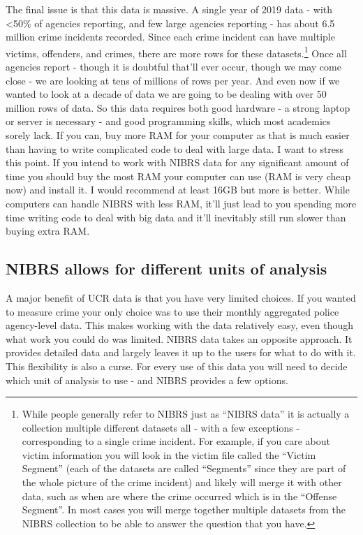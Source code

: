 \documentclass[
]{krantz}
\begin{document}
The final issue is that this data is massive. A single year
of 2019 data - with \textless50\% of agencies reporting, and
few large agencies reporting - has about 6.5 million crime
incidents recorded. Since each crime incident can have
multiple victims, offenders, and crimes, there are more rows
for these datasets.\footnote{While people generally refer to
  NIBRS just as ``NIBRS data'' it is actually a collection
  multiple different datasets all - with a few exceptions -
  corresponding to a single crime incident. For example, if
  you care about victim information you will look in the
  victim file called the ``Victim Segment'' (each of the
  datasets are called ``Segments'' since they are part of
  the whole picture of the crime incident) and likely will
  merge it with other data, such as when are where the crime
  occurred which is in the ``Offense Segment''. In most
  cases you will merge together multiple datasets from the
  NIBRS collection to be able to answer the question that
  you have.} Once all agencies report - though it is
doubtful that'll ever occur, though we may come close - we
are looking at tens of millions of rows per year. And even
now if we wanted to look at a decade of data we are going to
be dealing with over 50 million rows of data. So this data
requires both good hardware - a strong laptop or server is
necessary - and good programming skills, which most
academics sorely lack. If you can, buy more RAM for your
computer as that is much easier than having to write
complicated code to deal with large data. I want to stress
this point. If you intend to work with NIBRS data for any
significant amount of time you should buy the most RAM your
computer can use (RAM is very cheap now) and install it. I
would recommend at least 16GB but more is better. While
computers can handle NIBRS with less RAM, it'll just lead to
you spending more time writing code to deal with big data
and it'll inevitably still run slower than buying extra RAM.

\subsection{NIBRS allows for different units of
analysis}\label{nibrs-allows-for-different-units-of-analysis}

A major benefit of UCR data is that you have very limited
choices. If you wanted to measure crime your only choice was
to use their monthly aggregated police agency-level data.
This makes working with the data relatively easy, even
though what work you could do was limited. NIBRS data takes
an opposite approach. It provides detailed data and largely
leaves it up to the users for what to do with it. This
flexibility is also a curse. For every use of this data you
will need to decide which unit of analysis to use - and
NIBRS provides a few options.
\end{document}
